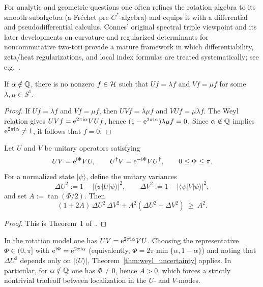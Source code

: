 \begin{remark}
For analytic and geometric questions one often refines the rotation algebra to its smooth subalgebra (a Fr\'echet pre-$C^*$-algebra) and equips it with a differential and pseudodifferential calculus.
Connes' original spectral triple viewpoint and its later developments on curvature and regularized determinants for noncommutative two-tori provide a mature framework in which differentiability, zeta/heat regularizations, and local index formulas are treated systematically; see e.g.~\cite{Connes1980,Rieffel1990,ConnesTretkoff2012,ConnesMoscovici2014}.
\end{remark}

\begin{corollary}
\label{cor:no_common_eigenvectors}
If $\alpha\notin\mathbb{Q}$, there is no nonzero $f\in\mathcal{H}$ such that $Uf=\lambda f$ and $Vf=\mu f$ for some $\lambda,\mu\in S^1$.
\end{corollary}

\begin{proof}
If $Uf=\lambda f$ and $Vf=\mu f$, then $UVf=\lambda\mu f$ and $VUf=\mu\lambda f$. The Weyl relation gives $UVf=\mathrm{e}^{2\pi\mathrm{i}\alpha}VUf$, hence $(1-\mathrm{e}^{2\pi\mathrm{i}\alpha})\lambda\mu f=0$. Since $\alpha\notin\mathbb{Q}$ implies $\mathrm{e}^{2\pi\mathrm{i}\alpha}\ne 1$, it follows that $f=0$.
\end{proof}

\begin{theorem}
\label{thm:weyl_uncertainty}
Let $U$ and $V$ be unitary operators satisfying
$$
UV = \mathrm{e}^{\mathrm{i}\Phi} VU,\qquad U^\dagger V = \mathrm{e}^{-\mathrm{i}\Phi} VU^\dagger,
\qquad 0\le \Phi\le \pi.
$$
For a normalized state $|\psi\rangle$, define the unitary variances
$$
\Delta U^2 := 1-|\langle \psi|U|\psi\rangle|^2,\qquad
\Delta V^2 := 1-|\langle \psi|V|\psi\rangle|^2,
$$
and set $A:=\tan(\Phi/2)$. Then
$$
(1+2A)\,\Delta U^2\,\Delta V^2 + A^2(\Delta U^2+\Delta V^2)\ \ge\ A^2.
$$
\end{theorem}

\begin{proof}
This is Theorem~1 of~\cite{MassarSpindel2008}.
\end{proof}

\begin{remark}
In the rotation model one has $UV=\mathrm{e}^{2\pi\mathrm{i}\alpha}VU$. Choosing the representative $\Phi\in(0,\pi]$ with $\mathrm{e}^{\mathrm{i}\Phi}=\mathrm{e}^{2\pi\mathrm{i}\alpha}$ (equivalently, $\Phi=2\pi\min\{\alpha,1-\alpha\}$) and noting that $\Delta U^2$ depends only on $|\langle U\rangle|$, Theorem~\ref{thm:weyl_uncertainty} applies. In particular, for $\alpha\notin\mathbb{Q}$ one has $\Phi\ne 0$, hence $A>0$, which forces a strictly nontrivial tradeoff between localization in the $U$- and $V$-modes.
\end{remark}


